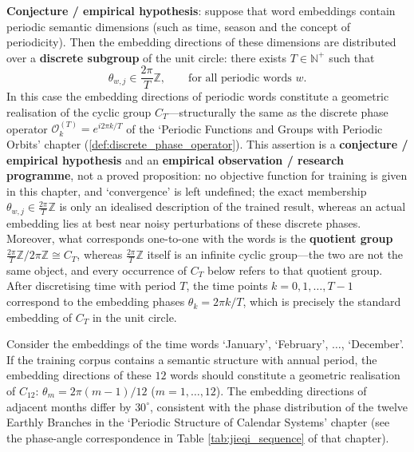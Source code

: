 \begin{remark}\label{prop:embedding_periodicity_generation}
\textbf{Conjecture / empirical hypothesis}: suppose that word embeddings contain periodic semantic dimensions (such as time, season and the concept of periodicity). Then the embedding directions of these dimensions are distributed over a \textbf{discrete subgroup} of the unit circle: there exists $T\in\mathbb{N}^+$ such that
\[
\theta_{w,j}\in\frac{2\pi}{T}\mathbb{Z},\qquad \text{for all periodic words }w.
\]
In this case the embedding directions of periodic words constitute a geometric realisation of the cyclic group $C_T$---structurally the same as the discrete phase operator $\mathcal{O}_k^{(T)}=e^{i2\pi k/T}$ of the `Periodic Functions and Groups with Periodic Orbits' chapter (\cref{def:discrete_phase_operator}).
This assertion is a \textbf{conjecture / empirical hypothesis} and an \textbf{empirical observation / research programme}, not a proved proposition: no objective function for training is given in this chapter, and `convergence' is left undefined; the exact membership $\theta_{w,j}\in\frac{2\pi}{T}\mathbb Z$ is only an idealised description of the trained result, whereas an actual embedding lies at best near noisy perturbations of these discrete phases. Moreover, what corresponds one-to-one with the words is the \textbf{quotient group} $\frac{2\pi}{T}\mathbb{Z}\big/2\pi\mathbb{Z}\cong C_T$, whereas $\frac{2\pi}{T}\mathbb{Z}$ itself is an infinite cyclic group---the two are not the same object, and every occurrence of $C_T$ below refers to that quotient group. After discretising time with period $T$, the time points $k=0,1,\dots,T-1$ correspond to the embedding phases $\theta_k=2\pi k/T$, which is precisely the standard embedding of $C_T$ in the unit circle.
\end{remark}

\begin{example}\label{ex:time_word_embedding}
Consider the embeddings of the time words `January', `February', $\dots$, `December'. If the training corpus contains a semantic structure with annual period, the embedding directions of these $12$ words should constitute a geometric realisation of $C_{12}$: $\theta_{m}=2\pi(m-1)/12$ ($m=1,\dots,12$). The embedding directions of adjacent months differ by $30^\circ$, consistent with the phase distribution of the twelve Earthly Branches in the `Periodic Structure of Calendar Systems' chapter (see the phase-angle correspondence in Table \ref{tab:jieqi_sequence} of that chapter).
\end{example}

